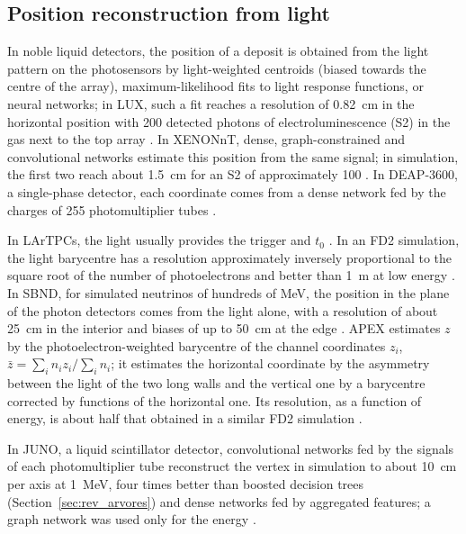 \label{sec:revisao}

\subsection{Position reconstruction from light}
\label{sec:rev_luz}

In noble liquid detectors, the position of a deposit is obtained from the light pattern on the photosensors by light-weighted centroids (biased towards the centre of the array), maximum-likelihood fits to light response functions, or neural networks; in LUX, such a fit reaches a resolution of \qty{0.82}{\cm} in the horizontal position with \num{200} detected photons of electroluminescence (S2) in the gas next to the top array \citep{akerib2018position}. In XENONnT, dense, graph-constrained and convolutional networks estimate this position from the same signal; in simulation, the first two reach about \qty{1.5}{\cm} for an S2 of approximately \qty{100}{\pe} \citep{aprile2025xenonnt}. In DEAP-3600, a single-phase detector, each coordinate comes from a dense network fed by the charges of \num{255} photomultiplier tubes \citep{adhikari2025position}.

In LArTPCs, the light usually provides the trigger and $t_0$ \citep{abratenko2024scintillation, paulucci2022dune}. In an FD2 simulation, the light barycentre has a resolution approximately inversely proportional to the square root of the number of photoelectrons and better than \qty{1}{\m} at low energy \citep{paulucci2022dune}. In SBND, for simulated neutrinos of hundreds of MeV, the position in the plane of the photon detectors comes from the light alone, with a resolution of about \qty{25}{\cm} in the interior and biases of up to \qty{50}{\cm} at the edge \citep{abratenko2024scintillation}. APEX estimates $z$ by the photoelectron-weighted barycentre of the channel coordinates $z_i$, $\bar{z} = \sum_i n_i z_i / \sum_i n_i$; it estimates the horizontal coordinate by the asymmetry between the light of the two long walls and the vertical one by a barycentre corrected by functions of the horizontal one. Its resolution, as a function of energy, is about half that obtained in a similar FD2 simulation \citep{marinho2025apex}.

In JUNO, a liquid scintillator detector, convolutional networks fed by the signals of each photomultiplier tube reconstruct the vertex in simulation to about \qty{10}{\cm} per axis at \qty{1}{\MeV}, four times better than boosted decision trees (Section~\ref{sec:rev_arvores}) and dense networks fed by aggregated features; a graph network was used only for the energy \citep{qian2021vertex}.

